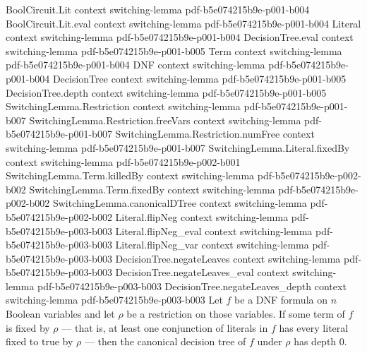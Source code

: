 \begin{lemma}
\label{SwitchingLemma.canonicalDTree_depth_zero_of_fixed}
\leanok
{}
\proofstep
  {BoolCircuit.Lit}
  {context}
  {switching-lemma}
  {pdf-b5e074215b9e-p001-b004}
\proofstep
  {BoolCircuit.Lit.eval}
  {context}
  {switching-lemma}
  {pdf-b5e074215b9e-p001-b004}
\proofstep
  {Literal}
  {context}
  {switching-lemma}
  {pdf-b5e074215b9e-p001-b004}
\proofstep
  {DecisionTree.eval}
  {context}
  {switching-lemma}
  {pdf-b5e074215b9e-p001-b005}
\proofstep
  {Term}
  {context}
  {switching-lemma}
  {pdf-b5e074215b9e-p001-b004}
\proofstep
  {DNF}
  {context}
  {switching-lemma}
  {pdf-b5e074215b9e-p001-b004}
\proofstep
  {DecisionTree}
  {context}
  {switching-lemma}
  {pdf-b5e074215b9e-p001-b005}
\proofstep
  {DecisionTree.depth}
  {context}
  {switching-lemma}
  {pdf-b5e074215b9e-p001-b005}
\proofstep
  {SwitchingLemma.Restriction}
  {context}
  {switching-lemma}
  {pdf-b5e074215b9e-p001-b007}
\proofstep
  {SwitchingLemma.Restriction.freeVars}
  {context}
  {switching-lemma}
  {pdf-b5e074215b9e-p001-b007}
\proofstep
  {SwitchingLemma.Restriction.numFree}
  {context}
  {switching-lemma}
  {pdf-b5e074215b9e-p001-b007}
\proofstep
  {SwitchingLemma.Literal.fixedBy}
  {context}
  {switching-lemma}
  {pdf-b5e074215b9e-p002-b001}
\proofstep
  {SwitchingLemma.Term.killedBy}
  {context}
  {switching-lemma}
  {pdf-b5e074215b9e-p002-b002}
\proofstep
  {SwitchingLemma.Term.fixedBy}
  {context}
  {switching-lemma}
  {pdf-b5e074215b9e-p002-b002}
\proofstep
  {SwitchingLemma.canonicalDTree}
  {context}
  {switching-lemma}
  {pdf-b5e074215b9e-p002-b002}
\proofstep
  {Literal.flipNeg}
  {context}
  {switching-lemma}
  {pdf-b5e074215b9e-p003-b003}
\proofstep
  {Literal.flipNeg_eval}
  {context}
  {switching-lemma}
  {pdf-b5e074215b9e-p003-b003}
\proofstep
  {Literal.flipNeg_var}
  {context}
  {switching-lemma}
  {pdf-b5e074215b9e-p003-b003}
\proofstep
  {DecisionTree.negateLeaves}
  {context}
  {switching-lemma}
  {pdf-b5e074215b9e-p003-b003}
\proofstep
  {DecisionTree.negateLeaves_eval}
  {context}
  {switching-lemma}
  {pdf-b5e074215b9e-p003-b003}
\proofstep
  {DecisionTree.negateLeaves_depth}
  {context}
  {switching-lemma}
  {pdf-b5e074215b9e-p003-b003}
Let $f$ be a DNF formula on $n$ Boolean variables and let $\rho$ be a restriction on
those variables. If some term of $f$ is fixed by $\rho$ — that is, at least one
conjunction of literals in $f$ has every literal fixed to true by $\rho$ — then the
canonical decision tree of $f$ under $\rho$ has depth $0$.
\end{lemma}

